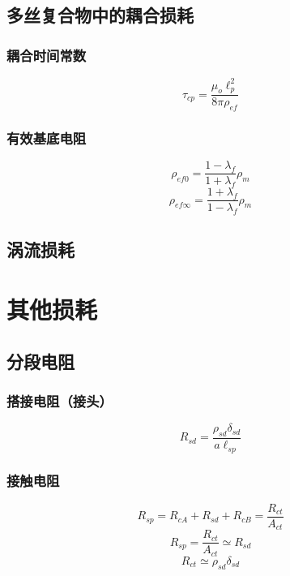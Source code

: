 \subsection{多丝复合物中的耦合损耗}

\subsubsection*{耦合时间常数}
\begin{equation}%
\tau_{cp}=\frac{\mu_o\ell_{p}^{2}}{8\pi\rho_{ef}}
\end{equation}


\subsubsection*{有效基底电阻}

\begin{equation}%
\rho_{ef0}=\frac{1-\lambda_f}{1+\lambda_f}\rho_m
\end{equation}
\begin{equation}%
\rho_{ef\infty}=\frac{1+\lambda_f}{1-\lambda_f}\rho_m
\end{equation}

\subsection{涡流损耗}

\section{其他损耗}

\subsection{分段电阻}



\subsubsection*{搭接电阻（接头）}
\begin{equation}%
R_{sd}=\frac{\rho_{sd}\delta_{sd}}{a\ell_{sp}}
\end{equation}


\subsubsection*{接触电阻}
\begin{equation}%
R_{sp}=R_{cA}+R_{sd}+R_{cB} 
=\frac{R_{ct}}{A_{ct}}
\end{equation}
\begin{equation}%
R_{sp}=\frac{R_{ct}}{A_{ct}}\simeq R_{sd}
\end{equation}
\begin{equation}%
R_{ct}\simeq\rho_{sd}\delta_{sd}
\end{equation}


